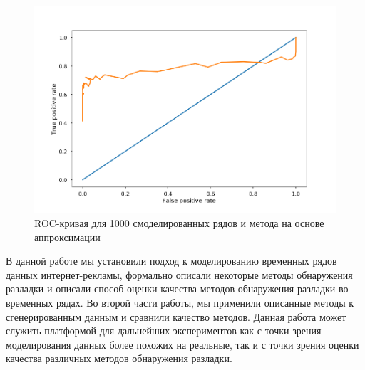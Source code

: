 \documentclass[%
12pt,
master,  %
natbib,      %
subf,        %
substylefile = spbu.rtx,
href,        %
colorlinks,  %
]{disser}
\begin{document}
\begin{figure}[!hhh]
	\begin{center}
		\includegraphics[width=12cm]{approximation_mean_2_roc}
	\end{center}
	\vspace{-5mm}\caption{ROC-кривая для 1000 смоделированных рядов и метода на основе аппроксимации}
	\label{fig:approximation_mean_2_roc}
\end{figure}


\conclusion
В данной работе мы установили подход к моделированию временных рядов данных интернет-рекламы, формально описали некоторые методы обнаружения разладки и описали способ оценки качества методов обнаружения разладки во временных рядах. Во второй части работы, мы применили описанные методы к сгенерированным данным и сравнили качество методов. Данная работа может служить платформой для дальнейших экспериментов как с точки зрения моделирования данных более похожих на реальные, так и с точки зрения оценки качества различных методов обнаружения разладки.
\end{document}
